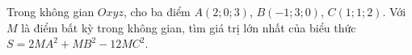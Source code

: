 \begin{ex}
Trong không gian $Oxyz$, cho ba điểm $A(2;0;3)$, $B(-1;3;0)$, $C(1;1;2)$. Với $M$ là điểm bất kỳ trong không gian, tìm giá trị lớn nhất của biểu thức $S=2MA^2+MB^2-12MC^2$.
\end{ex}
